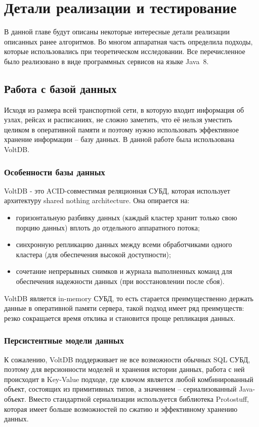 \chapter{Детали реализации и тестирование}
В данной главе будут описаны некоторые интересные детали реализации описанных ранее алгоритмов. Во многом аппаратная часть определила подходы, которые использовались при теоретическом исследовании. Все перечисленное было реализовано в виде программных сервисов на языке Java~8.
\section{Работа с базой данных}
Исходя из размера всей транспортной сети, в которую входит информация об узлах, рейсах и расписаниях, не сложно заметить, что её нельзя уместить целиком в оперативной памяти и поэтому нужно использовать эффективное хранение информации -- базу данных. В данной работе была использована VoltDB.
\subsection{Особенности базы данных}
VoltDB - это ACID-совместимая реляционная СУБД, которая использует архитектуру shared nothing architecture. Она опирается на:
\begin{itemize}
	\item горизонтальную разбивку данных (каждый кластер хранит только свою порцию данных) вплоть до отдельного аппаратного потока;
	\item синхронную репликацию данных между всеми обработчиками одного кластера (для обеспечения высокой доступности);
	\item сочетание непрерывных снимков и журнала выполненных команд для обеспечения надежности данных (при восстановлении после сбоя).
\end{itemize}
VoltDB является in-memory СУБД, то есть старается преимущественно держать данные в оперативной памяти сервера, такой подход имеет ряд преимуществ: резко сокращается время отклика и становится проще репликация данных.
\subsection{Персистентные модели данных}
К сожалению, VoltDB поддерживает не все возможности обычных SQL СУБД, поэтому для версионности моделей и хранения истории данных, работа с ней происходит в Key-Value подходе, где ключом является любой комбинированный объект, состоящих из примитивных типов, а значением -- сериализованный Java-объект. Вместо стандартной сериализации используется библиотека Protostuff, которая имеет больше возможностей по сжатию и эффективному хранению данных.

